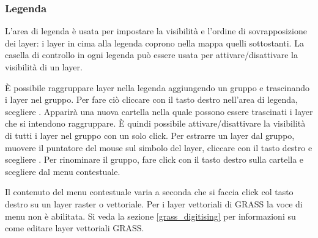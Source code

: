 \subsubsection{Legenda}\label{label_legend}

L'area di legenda è usata per impostare la visibilità e l'ordine di sovrapposizione dei layer:
i layer in cima alla legenda coprono nella mappa quelli sottostanti.
La casella di controllo in ogni legenda può essere usata per attivare/disattivare la 
visibilità di un layer.

È possibile raggruppare layer nella legenda aggiungendo un gruppo e trascinando i layer nel gruppo.
Per fare ciò cliccare con il tasto destro nell'area di legenda, scegliere . 
Apparirà una nuova cartella nella quale possono essere trascinati i layer che si intendono raggruppare. È quindi possibile attivare/disattivare la 
visibilità di tutti i layer nel gruppo con un solo click. Per estrarre un layer dal gruppo, muovere 
il puntatore del mouse sul simbolo del layer, cliccare con il tasto destro e scegliere . Per rinominare il gruppo, 
fare click con il tasto destro sulla cartella e scegliere  dal menu contestuale.

Il contenuto del menu contestuale varia a seconda che si faccia click col tasto destro
su un layer raster o vettoriale. Per i layer vettoriali di GRASS la voce di menu 
non è abilitata. Si veda la sezione \ref{grass_digitising} per informazioni su come editare layer vettoriali GRASS. 

